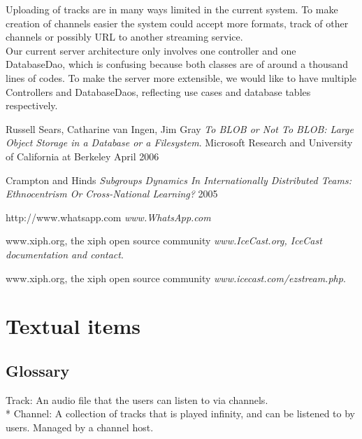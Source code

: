 \documentclass[a4paper,11pt,report]{article}
\begin{document}
{Uploading of tracks are in many ways limited in the current system. To make creation of channels easier the system could accept more formats, track of other channels or possibly URL to another streaming service. \\
Our current server architecture only involves one controller and one DatabaseDao, which is confusing because both classes are of around a thousand lines of codes. To make the server more extensible, we would like to have multiple Controllers and DatabaseDaos, reflecting use cases and database tables respectively. \\



\begin{thebibliography}{9}
  Russell Sears, Catharine van Ingen, Jim Gray
  \emph{To BLOB or Not To BLOB: 
Large Object Storage in a Database or a Filesystem}.
  Microsoft Research and University of California at Berkeley
  April 2006
  
 Crampton and Hinds \emph{Subgroups Dynamics In
Internationally Distributed
Teams: Ethnocentrism Or
Cross-National Learning? } 2005
	
 http://www.whatsapp.com \emph{www.WhatsApp.com}
	
  www.xiph.org, the xiph open source community
  \emph{www.IceCast.org, IceCast documentation and contact}.
    
  www.xiph.org, the xiph open source community
  \emph{www.icecast.com/ezstream.php}.
\end{thebibliography}
\newpage
\appendix
\section{Textual items}
\subsection{Glossary}
Track: An audio file that the users can listen to via channels. \\*
Channel: A collection of tracks that is played infinity, and can be listened to by users. Managed by a channel host.
}
\end{document}
